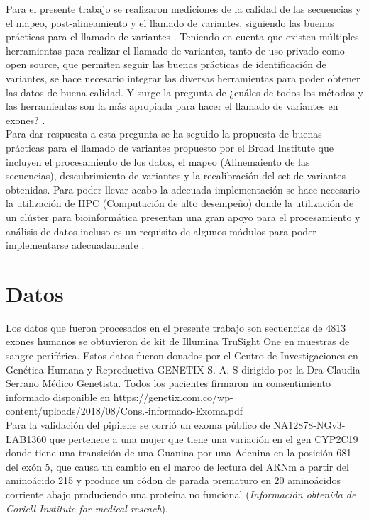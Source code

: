 Para el presente trabajo se realizaron mediciones de la calidad de las secuencias y el mapeo, post-alineamiento y el llamado de variantes, siguiendo las buenas prácticas para el llamado de variantes \cite{Fisch2015}. Teniendo en cuenta que existen múltiples herramientas para realizar el llamado de variantes, tanto de uso privado como open source, que permiten  seguir las buenas prácticas de identificación de variantes, se hace necesario integrar las diversas herramientas para poder obtener las datos de buena calidad. Y surge la pregunta de ¿cuáles de todos los métodos y las herramientas son la más apropiada para hacer el llamado de variantes en exones? \cite{Bao2014}\cite{Cornish2015}. \\

Para dar respuesta a esta pregunta se ha seguido la propuesta de buenas prácticas para el llamado de variantes propuesto por el Broad Institute que incluyen el procesamiento de los datos, el mapeo (Alinemaiento de las secuencias), descubrimiento de variantes y la recalibración del set de variantes obtenidas. Para poder llevar acabo la adecuada implementación se hace necesario la utilización de HPC (Computación de alto desempeño) donde la utilización de un clúster para bioinformática presentan una gran apoyo para el procesamiento y análisis de datos incluso es un requisito de algunos módulos para poder implementarse adecuadamente \cite{Fisch2015}. 

\section{Datos}

Los datos que fueron procesados en el presente trabajo son secuencias de 4813 exones humanos se obtuvieron de kit de Illumina TruSight One en muestras de sangre periférica. Estos datos  fueron donados por el Centro de Investigaciones en Genética Humana y Reproductiva GENETIX S. A. S dirigido por la Dra Claudia Serrano Médico Genetista. Todos los pacientes firmaron un consentimiento informado disponible en https://genetix.com.co/wp-content/uploads/2018/08/Cons.-informado-Exoma.pdf \\

Para la validación del pipilene se corrió un exoma público de  NA12878-NGv3-LAB1360 que pertenece a una mujer que tiene una variación en el gen CYP2C19 donde tiene una transición de una Guanina por una Adenina en la posición 681 del exón 5, que causa un cambio en el marco de lectura del ARNm a partir del aminoácido 215 y produce un códon de parada prematuro en 20 aminoácidos corriente abajo produciendo una proteína no funcional (\textit{Información obtenida de Coriell Institute for medical reseach}). \\

